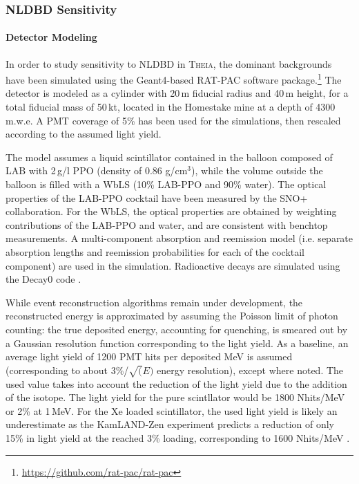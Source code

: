 \subsubsection{NLDBD Sensitivity}
\label{sec::sensitivity}
\paragraph{Detector Modeling}
In order to study sensitivity to NLDBD in \textsc{Theia}, the dominant
backgrounds have been simulated using the Geant4-based RAT-PAC software
package.\footnote{\url{https://github.com/rat-pac/rat-pac}}
The detector is modeled as a cylinder with 20\,m fiducial radius and 40\,m height, for a
total fiducial mass of 50\,kt, located in the Homestake mine at a depth of 4300\,m.w.e.
A PMT coverage of 5\% has been used for the simulations, then rescaled
according to the assumed light yield.

The model assumes a liquid scintillator contained in the balloon
composed of LAB with 2\,g/l PPO (density of 0.86 g/cm$^3$), while the volume outside the balloon is
filled with a WbLS (10\% LAB-PPO and 90\% water). The optical properties of
the LAB-PPO cocktail have been measured by the SNO+ collaboration. For the
WbLS, the optical properties are obtained by weighting contributions of the
LAB-PPO and water, and are consistent with benchtop measurements.
A multi-component absorption and reemission model (i.e. separate absorption
lengths and reemission probabilities for each of the cocktail component) are
used in the simulation. Radioactive decays are simulated using the Decay0
code \cite{decay0}.

While event reconstruction algorithms remain under development, the
reconstructed energy is approximated by assuming the Poisson limit of
photon counting: the true deposited energy, accounting for quenching, is
smeared out by a Gaussian resolution function corresponding to the light
yield. As a baseline, an average light yield of 1200 PMT hits per deposited
MeV is assumed (corresponding to about 3\%/$\sqrt(E)$ energy resolution), except where noted. The used value takes into account the reduction of the light yield due to the addition of the isotope. The light yield for the pure scintllator would be 1800 Nhits/MeV or 2\% at 1\,MeV. For the Xe loaded scintillator, the used light yield is likely an underestimate as the KamLAND-Zen experiment predicts a reduction of only 15\% in light yield at the reached 3\% loading, corresponding to 1600 Nhits/MeV \cite{KZ-2011}.


